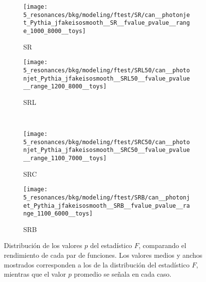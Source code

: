 \begin{figure}[ht!]
    \centering
    \begin{subfigure}[h]{0.49\linewidth}
        \centering
        \texttt{[image: 5\_resonances/bkg/modeling/ftest/SR/can\_\_photonjet\_Pythia\_jfakeisosmooth\_\_SR\_\_fvalue\_pvalue\_\_range\_1000\_8000\_\_toys]}
        \caption{SR}
    \end{subfigure}
    \begin{subfigure}[h]{0.49\linewidth}
        \centering
        \texttt{[image: 5\_resonances/bkg/modeling/ftest/SRL50/can\_\_photonjet\_Pythia\_jfakeisosmooth\_\_SRL50\_\_fvalue\_pvalue\_\_range\_1200\_8000\_\_toys]}
        \caption{SRL}
    \end{subfigure}
    \\
    \begin{subfigure}[h]{0.49\linewidth}
        \centering
        \texttt{[image: 5\_resonances/bkg/modeling/ftest/SRC50/can\_\_photonjet\_Pythia\_jfakeisosmooth\_\_SRC50\_\_fvalue\_pvalue\_\_range\_1100\_7000\_\_toys]}
        \caption{SRC}
    \end{subfigure}
    \begin{subfigure}[h]{0.49\linewidth}
        \centering
        \texttt{[image: 5\_resonances/bkg/modeling/ftest/SRB/can\_\_photonjet\_Pythia\_jfakeisosmooth\_\_SRB\_\_fvalue\_pvalue\_\_range\_1100\_6000\_\_toys]}
        \caption{SRB}
    \end{subfigure}
    \caption{Distribución de los valores \(p\) del estadístico \(F\), comparando el rendimiento de cada par de funciones. Los valores medios y anchos mostrados corresponden a los de la distribución del estadístico \(F\), mientras que el valor \(p\) promedio se señala en cada caso.}
    \label{fig:bkg:modeling:preparation:ftest:ftest_pvalue}
\end{figure}

